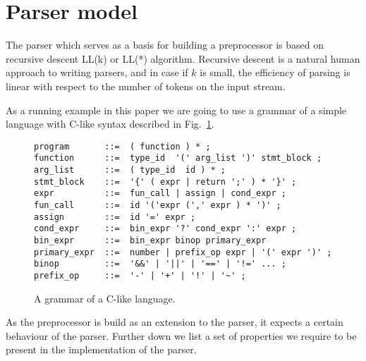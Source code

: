 \section{\label{sec:parser}Parser model}

The parser which serves as a basis for building a preprocessor is 
based on recursive descent LL(k) or LL(*) algorithm.  Recursive
descent is a natural human approach to writing parsers, and in
case if $k$ is small, the efficiency of parsing is linear with
respect to the number of tokens on the input stream. 

As a running example in this paper we are going to use a
grammar of a simple language with C-like syntax described in
Fig.~\ref{fig:grammar}.

\begin{figure}[h!]
\centering
\begin{verbatim}
program       ::=  ( function ) * ;
function      ::=  type_id  '(' arg_list ')' stmt_block ;
arg_list      ::=  ( type_id  id ) * ;
stmt_block    ::=  '{' ( expr | return ';' ) * '}' ;
expr          ::=  fun_call | assign | cond_expr ;
fun_call      ::=  id '('expr (',' expr ) * ')' ;
assign        ::=  id '=' expr ;
cond_expr     ::=  bin_expr '?' cond_expr ':' expr ;
bin_expr      ::=  bin_expr binop primary_expr
primary_expr  ::=  number | prefix_op expr | '(' expr ')' ;
binop         ::=  '&&' | '||' | '==' | '!=' ... ;
prefix_op     ::=  '-' | '+' | '!' | '~' ;
\end{verbatim}
\caption{\label{fig:grammar}A grammar of a C-like language.}
\end{figure}

\noindent
As the preprocessor is build as an extension to the parser, 
it expects a certain behaviour of the parser.  Further down
we list a set of properties we require to be present in the 
implementation of the parser.


